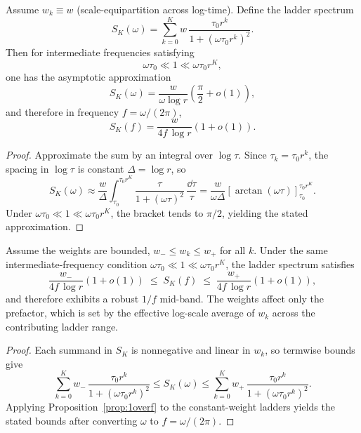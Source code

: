 \begin{proposition}
\label{prop:1overf}
Assume $w_k\equiv w$ (scale-equipartition across log-time). Define the ladder spectrum
\begin{equation}
  S_K(\omega)=\sum_{k=0}^{K} w\,\frac{\tau_0 r^k}{1+(\omega\tau_0 r^k)^2}.
\end{equation}
Then for intermediate frequencies satisfying
\begin{equation}
  \omega\tau_0 \ll 1 \ll \omega\tau_0 r^K,
\end{equation}
one has the asymptotic approximation
\begin{equation}
  S_K(\omega) = \frac{w}{\omega\log r}\left(\frac{\pi}{2}+o(1)\right),
\end{equation}
and therefore in frequency $f=\omega/(2\pi)$,
\begin{equation}
  S_K(f) = \frac{w}{4 f\,\log r}\left(1+o(1)\right).
\end{equation}
\end{proposition}
\begin{proof}
Approximate the sum by an integral over $\log\tau$. Since $\tau_k=\tau_0 r^k$, the spacing in $\log\tau$ is constant $\Delta=\log r$, so
\[
  S_K(\omega)\approx \frac{w}{\Delta}\int_{\tau_0}^{\tau_0 r^K}\frac{\tau}{1+(\omega\tau)^2}\,\frac{\dd\tau}{\tau}
  = \frac{w}{\omega\Delta}\left[\arctan(\omega\tau)\right]_{\tau_0}^{\tau_0 r^K}.
\]
Under $\omega\tau_0\ll 1\ll \omega\tau_0 r^K$, the bracket tends to $\pi/2$, yielding the stated approximation.
\end{proof}

\begin{corollary}
\label{cor:1overf_robust}
Assume the weights are bounded, $w_- \le w_k \le w_+$ for all $k$. Under the same intermediate-frequency condition $\omega\tau_0 \ll 1 \ll \omega\tau_0 r^K$, the ladder spectrum satisfies
\begin{equation}
  \frac{w_-}{4 f\,\log r}\left(1+o(1)\right)
  \;\le\;
  S_K(f)
  \;\le\;
  \frac{w_+}{4 f\,\log r}\left(1+o(1)\right),
\end{equation}
and therefore exhibits a robust \texorpdfstring{$1/f$}{1/f} mid-band. The weights affect only the prefactor, which is set by the effective log-scale average of $w_k$ across the contributing ladder range.
\end{corollary}
\begin{proof}
Each summand in $S_K$ is nonnegative and linear in $w_k$, so termwise bounds give
\[
  \sum_{k=0}^{K} w_-\,\frac{\tau_0 r^k}{1+(\omega\tau_0 r^k)^2}
  \le
  S_K(\omega)
  \le
  \sum_{k=0}^{K} w_+\,\frac{\tau_0 r^k}{1+(\omega\tau_0 r^k)^2}.
\]
Applying Proposition~\ref{prop:1overf} to the constant-weight ladders yields the stated bounds after converting $\omega$ to $f=\omega/(2\pi)$.
\end{proof}

